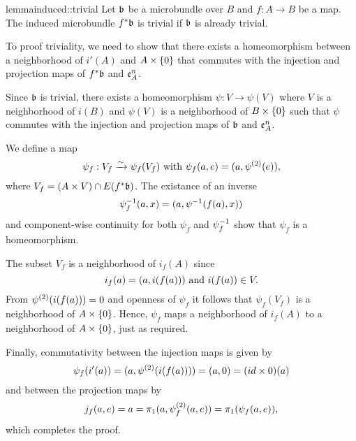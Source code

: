 \begin{mystatement}{lemma}{induced::trivial}
    Let $\bb$ be a microbundle over $B$ and $f: A \to B$ be a map.
    The induced microbundle $\ind{f}\bb$ is trivial if $\bb$ is already trivial.
\end{mystatement}

\begin{myproof}
    To proof triviality, we need to show that there exists a homeomorphism between a neighborhood of $i'(A)$ and $A \times{} \{0\}$
    that commutes with the injection and projection maps of $\ind{f}\bb$ and $\mathfrak{e}^{n}_{A}$.
    
    Since $\bb$ is trivial, there exists a homeomorphism $\psi: V \to \psi(V)$
    where $V$ is a neighborhood of $i(B)$ and $\psi(V)$ is a neighborhood of $B \times \{0\}$
    such that $\psi$ commutes with the injection and projection maps of $\bb$ and $\mathfrak{e}^{n}_{A}$.
    
    We define a map 
    \[ \psi_f: V_f \xrightarrow{\sim} \psi_f(V_f) \text{ with } \psi_f(a, e) = (a, \psi^{(2)}(e)), \]
    where $V_f = (A \cross V) \cap E(\ind{f}\bb)$.
    The existance of an inverse
    \[ \psi_f^{-1}(a, x) = (a, \psi^{-1}(f(a), x)) \]
    and component-wise continuity for both $\psi_f$ and $\psi_f^{-1}$
    show that $\psi_f$ is a homeomorphism.
    
    The subset $V_f$ is a neighborhood of $i_f(A)$ since
    \[ i_f(a) = (a, i(f(a))) \text{ and } i(f(a)) \in V. \]
    From $\psi^{(2)}(i(f(a))) = 0$ and openness of $\psi_f$
    it follows that $\psi_f(V_f)$ is a neighborhood of $A \times{} \{0\}$.
    Hence, $\psi_f$ maps a neighborhood of $i_f(A)$
    to a neighborhood of $A \times{} \{0\}$, just as required.

    Finally, commutativity between the injection maps is given by
    \[ \psi_f(i'(a)) = (a, \psi^{(2)}(i(f(a)))) = (a, 0) = (id \times 0)(a) \]
    and between the projection maps by
    \[ j_f(a, e) = a = \pi_1(a, \psi_f^{(2)}(a, e)) = \pi_1(\psi_f(a, e)), \]
    which completes the proof.
\end{myproof}